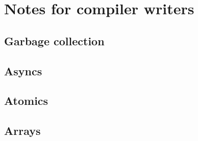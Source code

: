 \section{Notes for \Xten{} compiler writers}

\subsection{Garbage collection}
\subsection{Asyncs}
\subsection{Atomics}
\subsection{Arrays}